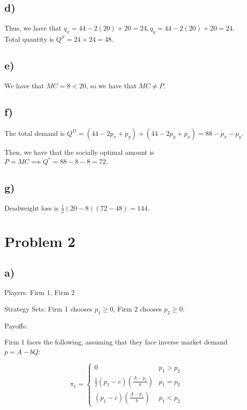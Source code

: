 \documentclass[12pt,letterpaper]{article}
\theoremstyle{definition}
\begin{document}
\subsection*{d)}

Thus, we have that $q_x = 44 - 2(20) + 20 = 24, q_y = 44 - 2(20) + 20 = 24$.
Total quantity is $Q^S = 24 + 24 = 48$.

\subsection*{e)}

We have that $MC = 8 < 20$, so we have that $MC \neq P$.

\subsection*{f)}

The total demand is $Q^D = (44 - 2p_x + p_y) + (44 - 2p_y + p_x) = 88 - p_x -
p_y$.

Then, we have that the socially optimal amount is $P = MC \implies Q^* = 88 - 8
- 8 = 72$.

\subsection*{g)}

Deadweight loss is $\frac{1}{2}(20 - 8)(72-48) = 144$.

\section*{Problem 2}

\subsection*{a)}

Players: Firm 1, Firm 2

Strategy Sets: Firm 1 chooses $p_1 \geq 0$, Firm 2 chooses $p_2 \geq 0$.

Payoffs:

Firm 1 faces the following, assuming that they face inverse market demand $p = A
- bQ$:

\[
  \pi_1 = \begin{cases}
    0 & p_1 > p_2 \\
    \frac{1}{2}(p_1 - c)(\frac{A - p_1}{b}) & p_1 = p_2 \\
    (p_1 - c)(\frac{A - p_1}{b}) & p_1 < p_2
  \end{cases}
\]
\end{document}

